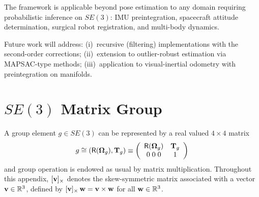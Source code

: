 \documentclass[journal]{IEEEtran}
\newcommand{\real}{\mathbb{R}}
\newcommand{\bfOmega}{\boldsymbol{\Omega}}
\newcommand{\beq}{\begin{equation}}
\newcommand{\eeq}{\end{equation}}
\begin{document}
The framework is applicable beyond pose estimation 
to any domain requiring probabilistic inference on 
$SE(3)$: IMU preintegration, spacecraft attitude 
determination, surgical robot registration, and 
multi-body dynamics.

Future work will address: (i)~recursive (filtering) 
implementations with the second-order corrections;
(ii)~extension to outlier-robust estimation via 
MAPSAC-type methods; (iii)~application to 
visual-inertial odometry with preintegration on 
manifolds.

\appendix

\section{$SE(3)$ Matrix Group}
\label{app:SE3group}
A group element $g\in SE(3)$ can be represented by a real valued $4\times 4$ matrix
\beq
    g \cong (\mathsf{R}(\bfOmega_g),{\bf T}_g) \equiv \left(
    \begin{array}{cc}
        \mathsf{R}(\bfOmega_g) & {\bf T}_g \\
        0\; 0\; 0 & 1
    \end{array} \right) \label{eq:SE3matrixrepresentation}
\eeq
and group operation is endowed as usual by matrix multiplication.
Throughout this appendix, $[{\bf v}]_\times$ denotes the skew-symmetric matrix associated
with a vector ${\bf v}\in\real^3$, defined by $[{\bf v}]_\times\,{\bf w} = {\bf v}\times{\bf w}$
for all ${\bf w}\in\real^3$.
\end{document}
